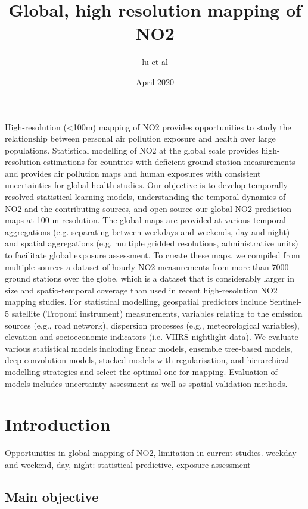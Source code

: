 \documentclass{article}
\title{Global, high resolution mapping of NO2}
\author{lu et al}
\date{April 2020}
\begin{document}
\maketitle

\abstract

High-resolution (<100m) mapping of NO2 provides opportunities to study the relationship between personal air pollution exposure and health over large populations. Statistical modelling of NO2 at the global scale provides high-resolution estimations for countries with deficient ground station measurements and provides air pollution maps and human exposures with consistent uncertainties for global health studies. Our objective is to develop temporally-resolved statistical learning models, understanding the temporal dynamics of NO2 and the contributing sources, and open-source our global NO2 prediction maps at 100 m resolution. The global maps are provided at various temporal aggregations (e.g. separating between weekdays and weekends, day and night) and spatial aggregations (e.g. multiple gridded resolutions, administrative units) to facilitate global exposure assessment. To create these maps, we compiled from multiple sources a dataset of hourly NO2 measurements from more than 7000 ground stations over the globe, which is a dataset that is considerably larger in size and spatio-temporal coverage than used in recent high-resolution NO2 mapping studies. For statistical modelling, geospatial predictors include Sentinel-5 satellite (Tropomi instrument) measurements, variables relating to the emission sources (e.g., road network), dispersion processes (e.g., meteorological variables), elevation and socioeconomic indicators (i.e. VIIRS nightlight data). We evaluate various statistical models including linear models, ensemble tree-based models, deep convolution models, stacked models with regularisation, and hierarchical modelling strategies and select the optimal one for mapping. Evaluation of models includes uncertainty assessment as well as spatial validation methods. 

\section{Introduction}
Opportunities in global mapping of NO2, limitation in current studies. 
weekday and weekend, day, night: statistical predictive, exposure assessment

\subsection{Main objective}
 
\end{document}
